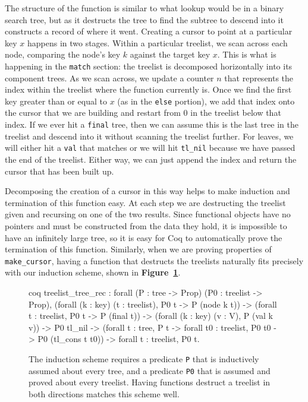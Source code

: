 \documentclass[12pt]{article}
\begin{document}
The structure of the function is similar to what lookup would be in a binary search tree, but as it destructs the tree to find the subtree to descend into it constructs a record of where it went. Creating a cursor to point at a particular key $x$ happens in two stages. Within a particular treelist, we scan across each node, comparing the node’s key $k$ against the target key $x$. This is what is happening in the \texttt{match} section: the treelist is decomposed horizontally into its component trees. As we scan across, we update a counter $n$ that represents the index within the treelist where the function currently is. Once we find the first key greater than or equal to $x$ (as in the \texttt{else} portion), we add that index onto the cursor that we are building and restart from 0 in the treelist below that index. If we ever hit a \texttt{final} tree, then we can assume this is the last tree in the treelist and descend into it without scanning the treelist further. For leaves, we will either hit a \texttt{val} that matches or we will hit \texttt{tl\_nil} because we have passed the end of the treelist. Either way, we can just append the index and return the cursor that has been built up.

Decomposing the creation of a cursor in this way helps to make induction and termination of this function easy. At each step we are destructing the treelist given and recursing on one of the two results. Since functional objects have no pointers and must be constructed from the data they hold, it is impossible to have an infinitely large tree, so it is easy for Coq to automatically prove the termination of this function. Similarly, when we are proving properties of \texttt{make\_cursor}, having a function that destructs the treelists naturally fits precisely with our induction scheme, shown in \textbf{Figure~\ref{fig:induction}}.

\begin{singlespace}
\begin{figure}[ht]
\centering
\begin{cminted}{coq}
treelist_tree_rec :
forall (P : tree -> Prop) (P0 : treelist -> Prop),
(forall (k : key) (t : treelist), P0 t -> P (node k t)) ->
(forall t : treelist, P0 t -> P (final t)) ->
(forall (k : key) (v : V), P (val k v)) ->
P0 tl_nil ->
(forall t : tree, P t ->
  forall t0 : treelist, P0 t0 -> P0 (tl_cons t t0)) ->
forall t : treelist, P0 t.
\end{cminted}
\caption{The induction scheme requires a predicate \texttt{P} that is inductively assumed about every tree, and a predicate \texttt{P0} that is assumed and proved about every treelist. Having functions destruct a treelist in both directions matches this scheme well.}
\label{fig:induction}
\end{figure}
\end{singlespace}
\end{document}
